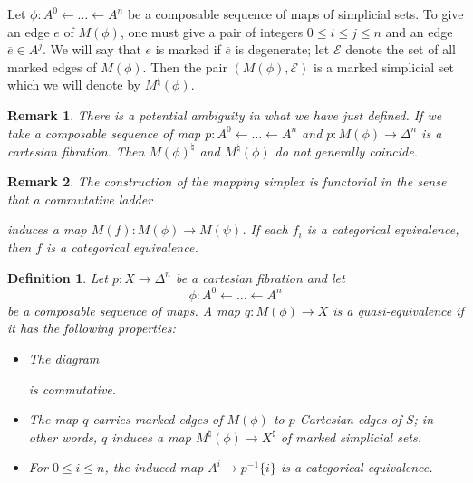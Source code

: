 \documentclass[12pt]{amsart}
\newcommand{\8}{\ensuremath{\infty}}
\newtheorem{definition}{Definition}
\newtheorem{remark}{Remark}
\begin{document}
{{Let $\phi:A^0\leftarrow \dots\leftarrow A^n$ be a composable sequence of maps of simplicial sets. To give an edge $e$ of $M(\phi)$, one must give a pair of integers $0\leq i\leq j\leq n$ and an edge $\overline{e}\in A^j$. We will say that $e$ is marked if $\overline{e}$ is degenerate; let $\mathcal{E}$ denote the set of all marked edges of $M(\phi)$. Then the pair $(M(\phi),\mathcal{E})$ is a marked simplicial set which we will denote by $M^\natural(\phi)$.

\begin{remark}
  There is a potential ambiguity in what we have just defined. If we take a composable sequence of map $p:A^0\leftarrow\dots\leftarrow A^n$ and $p:M(\phi)\rightarrow \Delta^n$ is a cartesian fibration. Then $M(\phi)^\natural$ and $M^\natural(\phi)$ do not generally coincide.
\end{remark}

\begin{remark}
  The construction of the mapping simplex is functorial in the sense that a commutative ladder
  induces a map $M(f):M(\phi)\rightarrow M(\psi)$. If each $f_i$ is a categorical equivalence, then $f$ is a categorical equivalence.
\end{remark}

\begin{definition}
  Let $p:X\rightarrow \Delta^n$ be a cartesian fibration and let \[\phi:A^0\leftarrow\dots\leftarrow A^n\] be a composable sequence of maps. A map $q:M(\phi)\rightarrow X$ is a quasi-equivalence if it has the following properties:
  \begin{itemize}
    \item The diagram
          is commutative.
    \item The map $q$ carries marked edges of $M(\phi)$ to $p$-Cartesian edges of $S$; in other words, $q$ induces a map $M^\natural(\phi)\rightarrow X^\natural$ of marked simplicial sets.
    \item For $0\leq i\leq n$, the induced map $A^i\rightarrow p^{-1}\{i\}$ is a categorical equivalence.
  \end{itemize}
\end{definition}

}}
\end{document}
